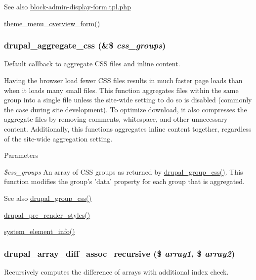 \begin{DoxySeeAlso}{See also}
\hyperlink{block-admin-display-form_8tpl_8php}{block-\/admin-\/display-\/form.tpl.php} 

\hyperlink{group__themeable_gacdf929f3196f98910f9761b46d672767}{theme\_\-menu\_\-overview\_\-form()} 
\end{DoxySeeAlso}
\hypertarget{common_8inc_a7d2aaae18c944ab87b16de225927e330}{
\subsubsection[{drupal\_\-aggregate\_\-css}]{\setlength{\rightskip}{0pt plus 5cm}drupal\_\-aggregate\_\-css (\&\$ {\em css\_\-groups})}}
\label{common_8inc_a7d2aaae18c944ab87b16de225927e330}
Default callback to aggregate CSS files and inline content.

Having the browser load fewer CSS files results in much faster page loads than when it loads many small files. This function aggregates files within the same group into a single file unless the site-\/wide setting to do so is disabled (commonly the case during site development). To optimize download, it also compresses the aggregate files by removing comments, whitespace, and other unnecessary content. Additionally, this functions aggregates inline content together, regardless of the site-\/wide aggregation setting.


\begin{DoxyParams}{Parameters}
\item[{\em \$css\_\-groups}]An array of CSS groups as returned by \hyperlink{common_8inc_a2d63a3ab0ae5c285f4546304a4775ae3}{drupal\_\-group\_\-css()}. This function modifies the group's 'data' property for each group that is aggregated.\end{DoxyParams}
\begin{DoxySeeAlso}{See also}
\hyperlink{common_8inc_a2d63a3ab0ae5c285f4546304a4775ae3}{drupal\_\-group\_\-css()} 

\hyperlink{common_8inc_a4b3889176f5132daa3f56a861d19aa95}{drupal\_\-pre\_\-render\_\-styles()} 

\hyperlink{system_8module_a39faa9a5430a70bb37a3c8af72460a14}{system\_\-element\_\-info()} 
\end{DoxySeeAlso}
\hypertarget{common_8inc_a9690f6b923ab69ff15d0f7dbf7bc1193}{
\subsubsection[{drupal\_\-array\_\-diff\_\-assoc\_\-recursive}]{\setlength{\rightskip}{0pt plus 5cm}drupal\_\-array\_\-diff\_\-assoc\_\-recursive (\$ {\em array1}, \/  \$ {\em array2})}}
\label{common_8inc_a9690f6b923ab69ff15d0f7dbf7bc1193}
Recursively computes the difference of arrays with additional index check.

